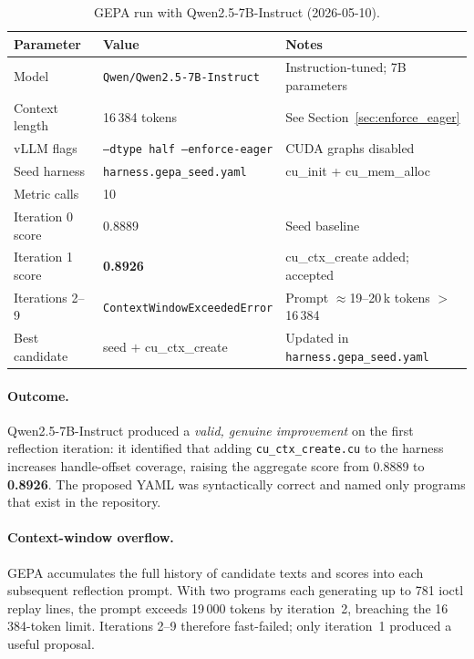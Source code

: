 \documentclass[11pt,a4paper]{article}
\begin{document}
\begin{table}[H]
\centering
\caption{GEPA run with Qwen2.5-7B-Instruct (2026-05-10).}
\label{tab:qwen}
\begin{tabular}{lll}
\toprule
\textbf{Parameter} & \textbf{Value} & \textbf{Notes} \\
\midrule
Model             & \texttt{Qwen/Qwen2.5-7B-Instruct} & Instruction-tuned; 7B parameters \\
Context length    & 16\,384 tokens & See Section~\ref{sec:enforce_eager} \\
vLLM flags        & \texttt{--dtype half --enforce-eager} & CUDA graphs disabled \\
Seed harness      & \texttt{harness.gepa\_seed.yaml} & cu\_init + cu\_mem\_alloc \\
Metric calls      & 10 & \\
\midrule
Iteration 0 score & 0.8889 & Seed baseline \\
Iteration 1 score & \textbf{0.8926} & cu\_ctx\_create added; accepted \\
Iterations 2--9   & \texttt{ContextWindowExceededError} & Prompt $\approx$19--20\,k tokens $>$ 16\,384 \\
Best candidate    & seed $+$ cu\_ctx\_create & Updated in \texttt{harness.gepa\_seed.yaml} \\
\bottomrule
\end{tabular}
\end{table}

\paragraph{Outcome.}
Qwen2.5-7B-Instruct produced a \emph{valid, genuine improvement} on the
first reflection iteration: it identified that adding \texttt{cu\_ctx\_create.cu}
to the harness increases handle-offset coverage, raising the aggregate score
from 0.8889 to \textbf{0.8926}.
The proposed YAML was syntactically correct and named only programs that
exist in the repository.

\paragraph{Context-window overflow.}
GEPA accumulates the full history of candidate texts and scores into each
subsequent reflection prompt.
With two programs each generating up to 781 ioctl replay lines, the prompt
exceeds 19\,000 tokens by iteration~2, breaching the 16\,384-token limit.
Iterations 2--9 therefore fast-failed; only iteration~1 produced a useful
proposal.
\end{document}
